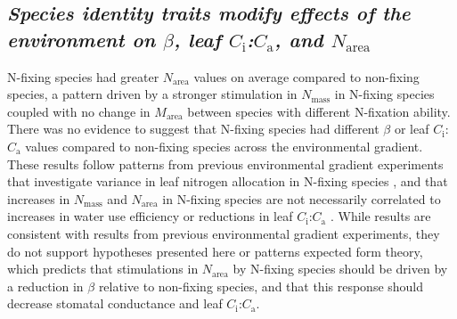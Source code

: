 \begin{singlespace}
\subsection{\textit{Species identity traits modify effects of the environment on $\beta$, leaf $C_\mathrm{i}$:$C_\mathrm{a}$, and $N_\mathrm{area}$}}
\end{singlespace}
\noindent N-fixing species had greater $N_\mathrm{area}$ values on average compared to non-fixing species, a pattern driven by a stronger stimulation in $N_\mathrm{mass}$ in N-fixing species coupled with no change in $M_\mathrm{area}$ between species with different N-fixation ability. There was no evidence to suggest that N-fixing species had different $\beta$ or leaf $C_\mathrm{i}$:$C_\mathrm{a}$ values compared to non-fixing species across the environmental gradient. These results follow patterns from previous environmental gradient experiments that investigate variance in leaf nitrogen allocation in N-fixing species , and that increases in $N_\mathrm{mass}$ and $N_\mathrm{area}$ in N-fixing species are not necessarily correlated to increases in water use efficiency or reductions in leaf $C_\mathrm{i}$:$C_\mathrm{a}$ . While results are consistent with results from previous environmental gradient experiments, they do not support hypotheses presented here or patterns expected form theory, which predicts that stimulations in $N_\mathrm{area}$ by N-fixing species should be driven by a reduction in $\beta$ relative to non-fixing species, and that this response should decrease stomatal conductance and leaf $C_\mathrm{i}$:$C_\mathrm{a}$.
    
